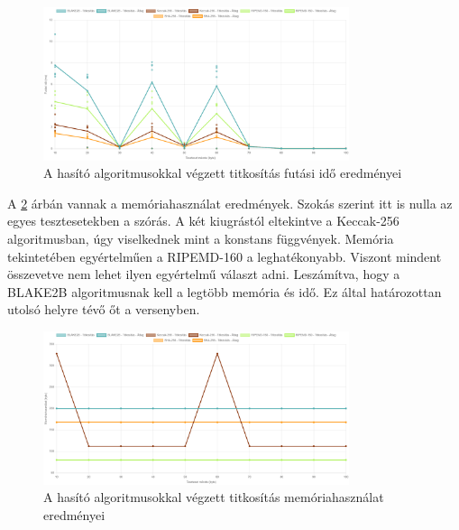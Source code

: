 \documentclass[12pt]{report} %
\begin{document}
\begin{figure}[H]
    \centering %
    \includegraphics[width=0.8\textwidth]{Figures/HashingEncryptionRunTime.png} %
    \caption{A hasító algoritmusokkal végzett titkosítás futási idő eredményei} %
    \label{fig:HashingEncryptionRunTime} %
\end{figure}

A \ref{fig:HashingEncryptionMemoryUsage} árbán vannak a memóriahasználat eredmények. Szokás szerint itt is nulla az egyes tesztesetekben a szórás. A két kiugrástól eltekintve a Keccak-256 algoritmusban, úgy viselkednek mint a konstans függvények. Memória tekintetében egyértelműen a RIPEMD-160 a leghatékonyabb. Viszont mindent összevetve nem lehet ilyen egyértelmű választ adni. Leszámítva, hogy a BLAKE2B algoritmusnak kell a legtöbb memória és idő. Ez által határozottan utolsó helyre tévő őt a versenyben.

\begin{figure}[H]
    \centering %
    \includegraphics[width=0.8\textwidth]{Figures/HashingEncryptionMemoryUsage.png} %
    \caption{A hasító algoritmusokkal végzett titkosítás memóriahasználat eredményei} %
    \label{fig:HashingEncryptionMemoryUsage} %
\end{figure}
\end{document}
